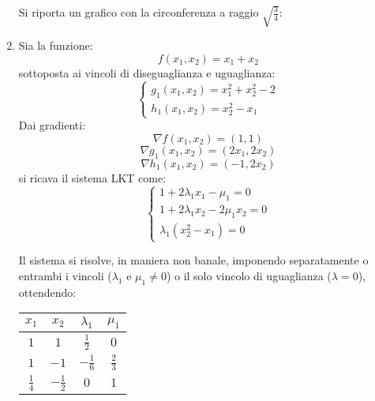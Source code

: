 \documentclass[a4paper,11pt]{article}
\begin{document}
\begin{enumerate}
Si riporta un grafico con la circonferenza a raggio $\sqrt{\frac{3}{4}}$:
\begin{center}
\end{center}
	\item  Sia la funzione:
$$
f(x_1, x_2) = x_1 + x_2
$$
sottoposta ai vincoli di diseguaglianza e uguaglianza:
\[
	\begin{cases}
		g_1(x_1, x_2) = x_1^2 + x_2^2 - 2 \\
		h_1(x_1, x_2) = x_2^2 - x_1
	\end{cases}
\]
Dai gradienti:
$$
\nabla f(x_1, x_2) = (1, 1)
$$
$$
\nabla g_1(x_1, x_2) = (2x_1, 2x_2)
$$
$$
\nabla h_1(x_1, x_2) = (-1, 2x_2)
$$
si ricava il sistema LKT come:
\[
	\begin{cases}
		1 + 2 \lambda_1 x_1 - \mu_1 = 0 \\ 
		1 + 2 \lambda_1 x_2 - 2 \mu_1 x_2 = 0\\ 
		\lambda_1 (x_2^2 - x_1) = 0
	\end{cases}
\]

Il sistema si risolve, in maniera non banale, imponendo separatamente o entrambi i vincoli ($\lambda_1$ e $\mu_1 \neq 0$) o il solo vincolo di uguaglianza ($\lambda = 0$), ottendendo:
\begin{table}[h!]
	\center 
	\begin{tabular} { c c | c c }
		$x_1$ & $x_2$ & $\lambda_1$ & $\mu_1$ \\
		\hline 
		$1$ & $1$ & $\frac{1}{2}$ & $0$ \\ 
		$1$ & $-1$ & $-\frac{1}{6}$ & $\frac{2}{3}$ \\ 
		$\frac{1}{4}$ & $-\frac{1}{2}$ & $0$ & $1$
 \end{tabular}
\end{table}


\end{enumerate}
\end{document}
